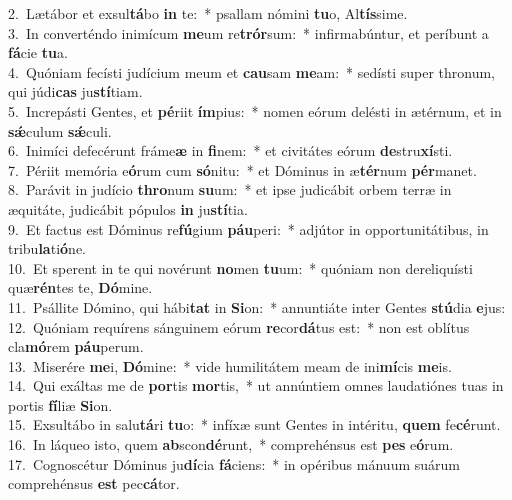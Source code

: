 {2.~}Lætábor et exsul\textbf{tá}bo \textbf{in} te:~* psallam nómini \textbf{tu}o, Al\textbf{tís}sime.\\
{3.~}In converténdo inimícum \textbf{me}um re\textbf{trór}sum:~* infirmabúntur, et períbunt a \textbf{fá}cie \textbf{tu}a.\\
{4.~}Quóniam fecísti judícium meum et \textbf{cau}sam \textbf{me}am:~* sedísti super thronum, qui júdi\textbf{cas} ju\textbf{stí}tiam.\\
{5.~}Increpásti Gentes, et \textbf{pé}riit \textbf{ím}pius:~* nomen eórum delésti in ætérnum, et in \textbf{sǽ}culum \textbf{sǽ}culi.\\
{6.~}Inimíci defecérunt fráme\textbf{æ} in \textbf{fi}nem:~* et civitátes eórum \textbf{de}stru\textbf{xí}sti.\\
{7.~}Périit memória e\textbf{ó}rum cum \textbf{só}nitu:~* et Dóminus in æ\textbf{tér}num \textbf{pér}manet.\\
{8.~}Parávit in judício \textbf{thro}num \textbf{su}um:~* et ipse judicábit orbem terræ in æquitáte, judicábit pópulos \textbf{in} ju\textbf{stí}tia.\\
{9.~}Et factus est Dóminus re\textbf{fú}gium \textbf{páu}peri:~* adjútor in opportunitátibus, in tribu\textbf{la}ti\textbf{ó}ne.\\
{10.~}Et sperent in te qui novérunt \textbf{no}men \textbf{tu}um:~* quóniam non dereliquísti quæ\textbf{rén}tes te, \textbf{Dó}mine.\\
{11.~}Psállite Dómino, qui hábi\textbf{tat} in \textbf{Si}on:~* annuntiáte inter Gentes \textbf{stú}dia \textbf{e}jus:\\
{12.~}Quóniam requírens sánguinem eórum \textbf{re}cor\textbf{dá}tus est:~* non est oblítus cla\textbf{mó}rem \textbf{páu}perum.\\
{13.~}Miserére \textbf{me}i, \textbf{Dó}mine:~* vide humilitátem meam de ini\textbf{mí}cis \textbf{me}is.\\
{14.~}Qui exáltas me de \textbf{por}tis \textbf{mor}tis,~* ut annúntiem omnes laudatiónes tuas in portis \textbf{fí}liæ \textbf{Si}on.\\
{15.~}Exsultábo in salu\textbf{tá}ri \textbf{tu}o:~* infíxæ sunt Gentes in intéritu, \textbf{quem} fe\textbf{cé}runt.\\
{16.~}In láqueo isto, quem \textbf{ab}scon\textbf{dé}runt,~* comprehénsus est \textbf{pes} e\textbf{ó}rum.\\
{17.~}Cognoscétur Dóminus ju\textbf{dí}cia \textbf{fá}ciens:~* in opéribus mánuum suárum comprehénsus \textbf{est} pec\textbf{cá}tor.\\

